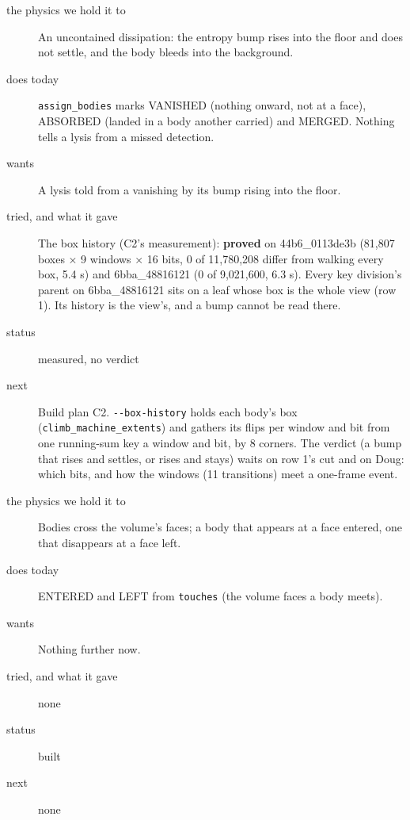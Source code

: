 \begin{description}
\item[{the physics we hold it to}] An uncontained dissipation: the entropy bump rises into the floor and does not settle, and the body bleeds into the background.
\item[{does today}] \texttt{assign\_\allowbreak{}bodies} marks VANISHED (nothing onward, not at a face), ABSORBED (landed in a body another carried) and MERGED. Nothing tells a lysis from a missed detection.
\item[{wants}] A lysis told from a vanishing by its bump rising into the floor.
\item[{tried, and what it gave}] The box history (C2's measurement): \textbf{proved} on 44b6\_\allowbreak{}0113de3b (81,807 boxes × 9 windows × 16 bits, 0 of 11,780,208 differ from walking every box, 5.4 s) and 6bba\_\allowbreak{}48816121 (0 of 9,021,600, 6.3 s). Every key division's parent on 6bba\_\allowbreak{}48816121 sits on a leaf whose box is the whole view (row 1). Its history is the view's, and a bump cannot be read there.
\item[{status}] measured, no verdict
\item[{next}] Build plan C2. \texttt{-\allowbreak{}-\allowbreak{}box-\allowbreak{}history} holds each body's box (\texttt{climb\_\allowbreak{}machine\_\allowbreak{}extents}) and gathers its flips per window and bit from one running-sum key a window and bit, by 8 corners. The verdict (a bump that rises and settles, or rises and stays) waits on row 1's cut and on Doug: which bits, and how the windows (11 transitions) meet a one-frame event.
\end{description}

\begin{description}
\item[{the physics we hold it to}] Bodies cross the volume's faces; a body that appears at a face entered, one that disappears at a face left.
\item[{does today}] ENTERED and LEFT from \texttt{touches} (the volume faces a body meets).
\item[{wants}] Nothing further now.
\item[{tried, and what it gave}] none
\item[{status}] built
\item[{next}] none
\end{description}

